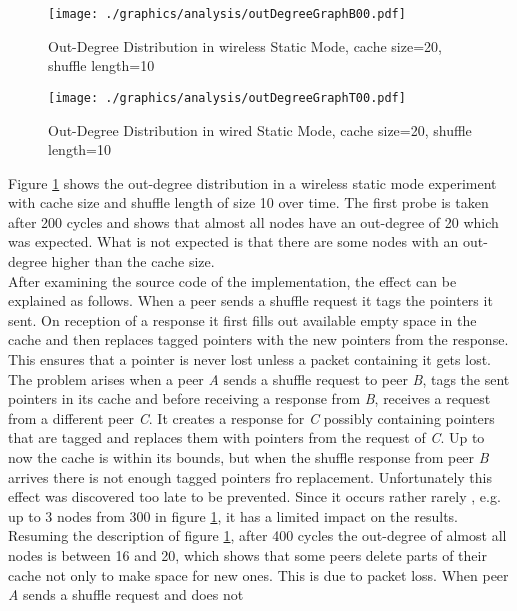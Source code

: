 \begin{figure}
	\texttt{[image: ./graphics/analysis/outDegreeGraphB00.pdf]}
	\caption{Out-Degree Distribution in wireless Static Mode, cache size=20,
	shuffle length=10}
	\label{fig:outDegreeDistB00}
\end{figure}

\begin{figure}
	\texttt{[image: ./graphics/analysis/outDegreeGraphT00.pdf]}
	\caption{Out-Degree Distribution in wired Static Mode, cache size=20, shuffle
	length=10}
	\label{fig:outDegreeDistT00}
\end{figure}

Figure \ref{fig:outDegreeDistB00} shows the out-degree distribution in a
wireless static mode experiment with cache size and shuffle length of size 10
over time. The first probe is taken after 200 cycles and shows that almost all
nodes have an out-degree of 20 which was expected. What is not expected is that
there are some nodes with an out-degree higher than the cache size.\\ 
After examining the source code of the implementation, the effect can be
explained as follows. When a peer sends a shuffle request it tags the pointers
it sent. On reception of a response it first fills out available empty space in
the cache and then replaces tagged pointers with the new pointers from the
response. This ensures that a pointer is never lost unless a packet containing
it gets lost. The problem arises when a peer \emph{A} sends a shuffle request
to peer \emph{B}, tags the sent pointers in its cache and before receiving a
response from \emph{B}, receives a request from a different peer \emph{C}. It
creates a response for \emph{C} possibly containing pointers that are tagged
and replaces them with pointers from the request of \emph{C}. Up to now the
cache is within its bounds, but when the shuffle response from peer \emph{B}
arrives there is not enough tagged pointers fro replacement. Unfortunately this
effect was discovered too late to be prevented. Since it occurs rather rarely ,
e.g. up to 3 nodes from 300 in figure \ref{fig:outDegreeDistB00}, it has a
limited impact on the results.\\
Resuming the description of figure \ref{fig:outDegreeDistB00}, after 400 cycles
the out-degree of almost all nodes is between 16 and 20, which shows that some
peers delete parts of their cache not only to make space for new ones. This is
due to packet loss. When peer \emph{A} sends a shuffle request and does not
